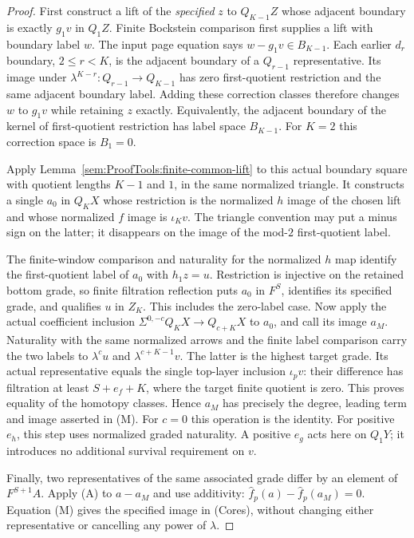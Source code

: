 \begin{proof}
First construct a lift of the \emph{specified} $z$ to $Q_{K-1}Z$ whose
adjacent boundary is exactly $g_1v$ in $Q_1Z$. Finite Bockstein comparison
first supplies a lift with boundary label $w$. The input page equation
says $w-g_1v\in B_{K-1}$. Each earlier $d_r$ boundary, $2\leq r<K$,
is the adjacent boundary of a $Q_{r-1}$ representative. Its image under
$\lambda^{K-r}:Q_{r-1}\to Q_{K-1}$ has zero first-quotient restriction
and the same adjacent boundary label. Adding these correction classes
therefore changes $w$ to $g_1v$ while retaining $z$ exactly.
Equivalently, the adjacent boundary of the kernel of first-quotient
restriction has label space $B_{K-1}$. For $K=2$ this correction space
is $B_1=0$.

Apply Lemma~\ref{sem:ProofTools:finite-common-lift} to this actual boundary
square with quotient lengths $K-1$ and $1$, in the same normalized triangle.
It constructs a single $a_0$ in $Q_KX$ whose restriction is the normalized
$h$ image of the chosen lift and whose normalized $f$ image is
$\iota_Kv$. The triangle convention may put a minus sign on the latter;
it disappears on the image of the mod-$2$ first-quotient label.

The finite-window comparison and naturality for the normalized $h$
map identify the first-quotient label of $a_0$ with $h_1z=u$.
Restriction is injective on the retained bottom grade, so finite
filtration reflection puts $a_0$ in $F^S$, identifies its specified
grade, and qualifies $u$ in $Z_K$. This includes the zero-label case.
Now apply the actual coefficient inclusion
$\Sigma^{0,-c}Q_KX\to Q_{c+K}X$ to $a_0$, and call its image $a_M$.
Naturality with the same normalized arrows and the finite label
comparison carry the two labels to $\lambda^cu$ and
$\lambda^{c+K-1}v$. The latter is the highest target grade.
Its actual representative equals the single top-layer inclusion
$\iota_pv$: their difference has filtration at least
$S+e_f+K$, where the target finite quotient is zero.
This proves equality of the homotopy classes.
Hence $a_M$ has precisely the degree, leading term
and image asserted in (M). For $c=0$ this operation is the identity.
For positive $e_h$, this step uses normalized graded naturality.
A positive $e_g$ acts here on $Q_1Y$; it introduces no additional survival
requirement on $v$.

Finally, two representatives of the same associated grade differ by an
element of $F^{S+1}A$. Apply (A) to $a-a_M$ and use additivity:
$\widehat f_p(a)-\widehat f_p(a_M)=0$. Equation (M) gives the specified
image in (Cores), without changing either representative or cancelling
any power of $\lambda$.
\end{proof}

